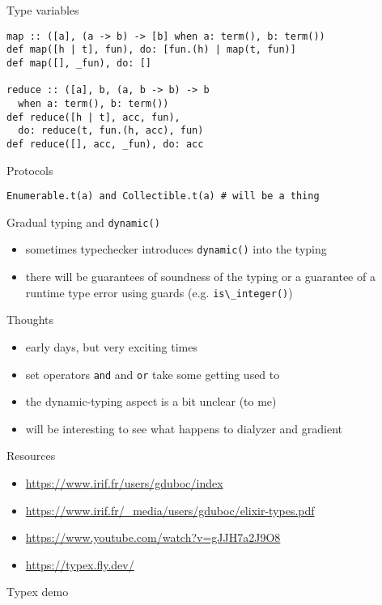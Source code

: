 \documentclass[
  ignorenonframetext,
]{beamer}
\newcommand{\passthrough}[1]{#1}
\providecommand{\tightlist}{%
  \setlength{\itemsep}{0pt}\setlength{\parskip}{0pt}}
\begin{document}
\begin{frame}[fragile]{Type variables}
\protect\hypertarget{type-variables}{}
\begin{lstlisting}
map :: ([a], (a -> b) -> [b] when a: term(), b: term())
def map([h | t], fun), do: [fun.(h) | map(t, fun)]
def map([], _fun), do: []

reduce :: ([a], b, (a, b -> b) -> b
  when a: term(), b: term())
def reduce([h | t], acc, fun),
  do: reduce(t, fun.(h, acc), fun)
def reduce([], acc, _fun), do: acc
\end{lstlisting}
\end{frame}

\begin{frame}[fragile]{Protocols}
\protect\hypertarget{protocols}{}
\begin{lstlisting}
Enumerable.t(a) and Collectible.t(a) # will be a thing
\end{lstlisting}
\end{frame}

\begin{frame}[fragile]{Gradual typing and
\passthrough{\lstinline!dynamic()!}}
\protect\hypertarget{gradual-typing-and-dynamic}{}
\begin{itemize}
\tightlist
\item
  sometimes typechecker introduces \passthrough{\lstinline!dynamic()!}
  into the typing
\item
  there will be guarantees of soundness of the typing or a guarantee of
  a runtime type error using guards (e.g.
  \passthrough{\lstinline!is\_integer()!})
\end{itemize}
\end{frame}

\begin{frame}[fragile]{Thoughts}
\protect\hypertarget{thoughts}{}
\begin{itemize}
\tightlist
\item
  early days, but very exciting times
\item
  set operators \passthrough{\lstinline!and!} and
  \passthrough{\lstinline!or!} take some getting used to
\item
  the dynamic-typing aspect is a bit unclear (to me)
\item
  will be interesting to see what happens to dialyzer and gradient
\end{itemize}
\end{frame}

\begin{frame}{Resources}
\protect\hypertarget{resources}{}
\begin{itemize}
\tightlist
\item
  \url{https://www.irif.fr/users/gduboc/index}
\item
  \url{https://www.irif.fr/_media/users/gduboc/elixir-types.pdf}
\item
  \url{https://www.youtube.com/watch?v=gJJH7a2J9O8}
\item
  \url{https://typex.fly.dev/}
\end{itemize}
\end{frame}

\begin{frame}{Typex demo}
\protect\hypertarget{typex-demo}{}
\end{frame}
\end{document}
